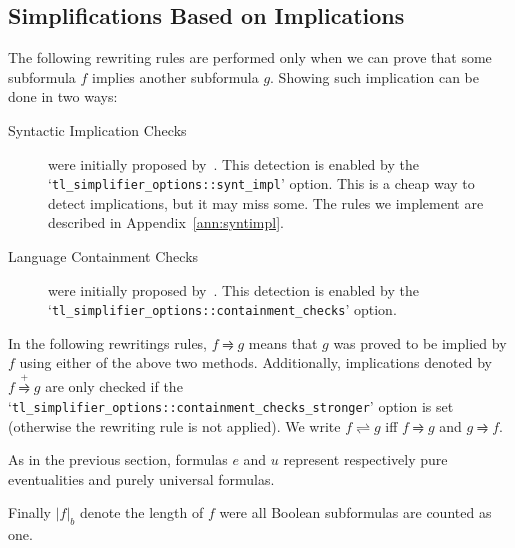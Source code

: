 \documentclass[a4paper,twoside,10pt,DIV=12]{scrreprt}
\newcommand{\0}{\texttt{0}}
\newcommand{\1}{\texttt{1}}
\def\simpe{\rightleftharpoons}
\def\simp{\rightrightharpoons}
\def\Simp{\stackrel{+}{\simp}}
\begin{document}
\subsection{Simplifications Based on Implications}
\label{sec:syntimpl}

The following rewriting rules are performed only when we can prove
that some subformula $f$ implies another subformula $g$.  Showing such
implication can be done in two ways:
\begin{description}
\item[Syntactic Implication Checks] were initially proposed
  by~\citet{somenzi.00.cav}.  This detection is enabled by the
  `\verb|tl_simplifier_options::synt_impl|' option.  This is a
  cheap way to detect implications, but it may miss some.  The rules
  we implement are described in Appendix~\ref{ann:syntimpl}.

\item[Language Containment Checks] were initially proposed
  by~\citet{tauriainen.03.tr}.  This detection is enabled by the
  `\verb|tl_simplifier_options::containment_checks|' option.
\end{description}

In the following rewritings rules, $f\simp g$ means that $g$ was
proved to be implied by $f$ using either of the above two methods.
Additionally, implications denoted by $f\Simp g$ are only checked if
the `\verb|tl_simplifier_options::containment_checks_stronger|'
option is set (otherwise the rewriting rule is not applied).  We write
$f\simpe g$ iff $f\simp g$ and $g\simp f$.

As in the previous section, formulas $e$ and $u$ represent
respectively pure eventualities and purely universal formulas.

Finally $|f|_b$ denote the length of $f$ were all Boolean subformulas
are counted as one.

\def\flessg{(f\simpe g) \land (|f|_b<|g|_b)}
\def\glessf{(f\simpe g) \land (|g|_b<|f|_b)}
\end{document}

